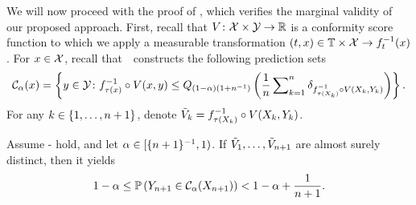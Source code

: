 
We will now proceed with the proof of , which verifies the marginal validity of our proposed approach. First, recall that \( V \colon \mathcal{X} \times \mathcal{Y} \to \mathbb{R} \) is a conformity score function to which we apply a measurable transformation \( (t, x) \in \mathbb{T} \times \mathcal{X} \to f_{t}^{-1}(x) \).
For $x\in\mathcal{X}$, recall that~\RCP\ constructs the following prediction sets
\begin{equation*}
  \mathcal{C}_{\alpha}(x)
  = \left\{{
    y\in\mathcal{Y}\colon f_{\tau(x)}^{-1}\circ V(x,y)
    \le Q_{(1-\alpha)(1+n^{-1})} \left({\frac{1}{n} \sum\nolimits_{k=1}^{n} \delta_{f_{\tau(X_{k})}^{-1}\circ V(X_{k},Y_{k})}}\right)
  }\right\}.
\end{equation*}
%
For any $k\in\{1,\ldots,n+1\}$, denote $\tilde{V}_k = f_{\tau(X_{k})}^{-1}\circ V(X_{k},Y_{k})$.

\begin{theorem}\label{suppl:thm:coverage:marginal}
  Assume - hold, and let $\alpha\in[\{n+1\}^{-1},1)$.
  If $\tilde{V}_1,\ldots,\tilde{V}_{n+1}$ are almost surely distinct, then it yields
  \begin{equation}\label{eq:prob:YinC}
    1 - \alpha
    \le \mathbb{P}\left({Y_{n+1} \in \mathcal{C}_{\alpha}(X_{n+1})}\right)
    < 1 - \alpha + \frac{1}{n+1}.
  \end{equation}
\end{theorem}

